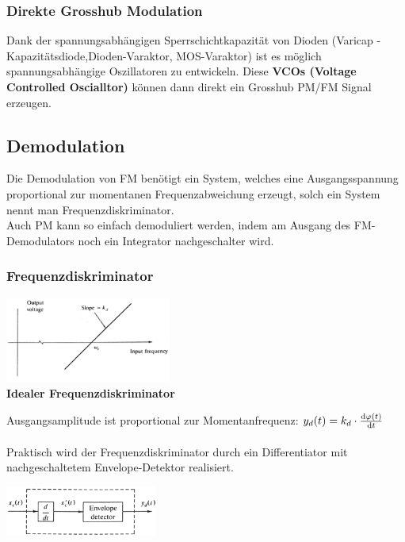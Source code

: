 \subsubsection{Direkte Grosshub Modulation }
	Dank der spannungsabhängigen Sperrschichtkapazität von Dioden (Varicap - Kapazitätsdiode,Dioden-Varaktor, MOS-Varaktor) ist es möglich spannungsabhängige Oszillatoren zu entwickeln. Diese \textbf{VCOs
	(Voltage Controlled Oscialltor)} können dann direkt ein Grosshub PM/FM Signal erzeugen.


\subsection{Demodulation}
	Die Demodulation von FM benötigt ein System, welches eine Ausgangsspannung proportional zur momentanen Frequenzabweichung erzeugt, solch ein System nennt man Frequenzdiskriminator. \\ 
	Auch PM kann so einfach demoduliert werden, indem am Ausgang des FM-Demodulators noch ein Integrator nachgeschalter wird.


\subsubsection{Frequenzdiskriminator}
	\begin{minipage}[t][3cm][c]{6cm}	
		\begin{center}
  			\includegraphics[height=2.8cm]{bilder/fm_pm_frequenzdiskriminatorAmplitudengang.png} \\
  			\textbf{Idealer Frequenzdiskriminator}
		\end{center}
	\end{minipage}
	\begin{minipage}[t][3cm][c]{6cm}
		Ausgangsamplitude ist proportional zur Momentanfrequenz: $y_d(t) = k_d \cdot \frac{\mathop{}\!\mathrm{d} \varphi(t)}{\mathop{}\!\mathrm{d} t}$\\ \\ 
		Praktisch wird der Frequenzdiskriminator durch ein Differentiator mit nachgeschaltetem Envelope-Detektor realisiert.
	\end{minipage}
	\begin{minipage}[t][3cm][c]{6cm} 
		\begin{center}
			\includegraphics[width=5cm]{bilder/fm_pm_frequenzdiskriminatorRealisierung.png} \\ 
  		\end{center}
	\end{minipage}

